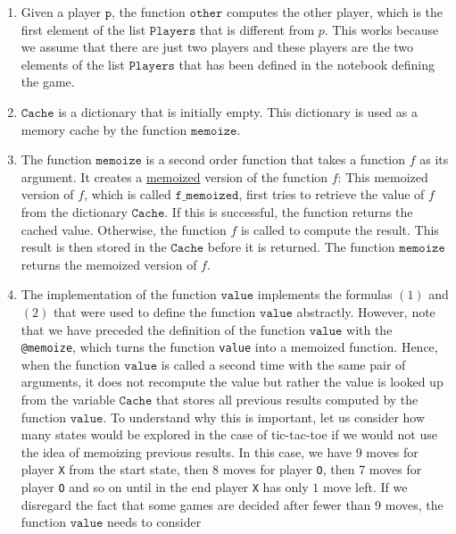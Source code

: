 \begin{enumerate}
\item Given a player $\texttt{p}$, the function $\texttt{other}$ computes the other player,
      which is the first element of the list $\texttt{Players}$ that is different from $p$.
      This works because we assume that there are just two players and these players are the two elements of
      the list $\texttt{Players}$ that has been defined in the notebook defining the game.
\item $\texttt{Cache}$ is a dictionary that is initially empty.  This dictionary is used as a memory cache by 
      the function $\texttt{memoize}$.
\item The function $\mathtt{memoize}$ is a second order function that takes a function $f$ as its argument.
      It creates a \href{https://en.wikipedia.org/wiki/Memoization}{memoized} version of the function $f$:
      This memoized version of $f$, which is called $\mathtt{f\_memoized}$, first tries to retrieve the value
      of $f$ from the dictionary $\texttt{Cache}$. 
      If this is successful, the function returns the cached value.  Otherwise, the function $f$ is called
      to compute the result.  This result is then stored in the $\mathtt{Cache}$ before it is returned.
      The function $\mathtt{memoize}$ returns the memoized version of $f$.
\item The implementation of the function $\texttt{value}$ implements the formulas $(1)$ and $(2)$ that were
      used to define the function $\mathtt{value}$ abstractly.
      However, note that we have preceded the definition of the function $\texttt{value}$ with the
       \texttt{@memoize}, which turns the function \texttt{value} into a memoized function.
      Hence, when the function $\texttt{value}$ is called a
      second time with the same pair of arguments, it does not recompute the value but rather the value is
      looked up from the variable $\texttt{Cache}$ that stores all previous results computed by the function $\texttt{value}$.  To
      understand why this is important, 
      let us consider how many states would be explored in the case of tic-tac-toe if we would not use the idea
      of memoizing previous results.  In this case, we have 9 moves for player
      \texttt{X} from the start state, then 8 moves for player \texttt{O}, then 7 moves for
      player \texttt{O} and so on until in the end player \texttt{X} has only $1$ move left.  If we disregard
      the fact that some games are decided after fewer than 9 moves, the function $\texttt{value}$ needs to consider 

\end{enumerate}
